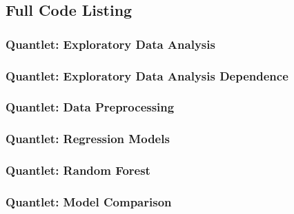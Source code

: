 







\FloatBarrier

\subsection{Full Code Listing}
\subsubsection{Quantlet: Exploratory Data Analysis}

\subsubsection{Quantlet: Exploratory Data Analysis Dependence}

\subsubsection{Quantlet: Data Preprocessing}

\subsubsection{Quantlet: Regression Models}

\subsubsection{Quantlet: Random Forest}

\subsubsection{Quantlet: Model Comparison}

